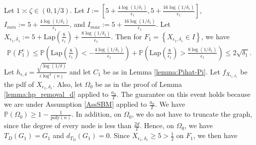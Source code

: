 \documentclass{article}
\begin{document}
Let $1 \asymp \zeta \in (0, 1/3)$. Let $I := \left[5 + \frac{4\log(1/\delta_1)}{\epsilon_1}, 5 + \frac{16\log(1/\delta_1)}{\epsilon_1}\right]$, $I_{min} := 5 + \frac{4\log(1/\delta_1)}{\epsilon_1}$, and $I_{max} := 5 + \frac{16\log(1/\delta_1)}{\epsilon_1}$. Let $X_{\epsilon_1, \delta_1} := 5 + \mathrm{Lap}\left(\frac{8}{\epsilon_1}\right) + \frac{8\log(1/\delta_1)}{\epsilon_1}$. Then for $F_1 = \left\{X_{\epsilon_1, \delta_1} \in I\right\}$, we have
\begin{align*}
 \mathbb{P}\left(F_1^c\right) \leq \mathbb{P}\left(\mathrm{Lap}\left(\frac{8}{\epsilon_1}\right) < -\frac{4\log(1/\delta_1)}{\epsilon_1}\right) + \mathbb{P}\left(\mathrm{Lap}\left(\frac{8}{\epsilon_1}\right) > \frac{8\log(1/\delta_1)}{\epsilon_1}\right) \leq 2\sqrt{\delta_1}.
\end{align*}
Let $h_{\epsilon, \delta} = \frac{\sqrt{\log(1/\delta)}}{\epsilon\log^4(n)}$ and let $C_1$ be as in Lemma \ref{lemma:Pihat-Pi}. Let $f_{X_{\epsilon_1, \delta_1}}$ be the pdf of $X_{\epsilon_1, \delta_1}$. Also, let $\Omega_0$ be as in the proof of Lemma \ref{lemma:hp_removal_d} applied to $\frac{a_n}{T}$. The guarantee on this event holds because we are under Assumption \ref{AssSBM} applied to $\frac{a_n}{T}$. We have $\mathbb{P}(\Omega_0) \geq 1 - \frac{1}{\mathrm{poly}(n)}$. In addition, on $\Omega_0$, we do not have to truncate the graph, since the degree of every node is less than $\frac{2d}{T}$. Hence, on $\Omega_0$, we have $T_{D}(G_1) = G_1$ and $d_{T_{D}}(G_1) = 0$. Since $X_{\epsilon_1, \delta_1} \geq 5 > \frac{1}{2}$ on $F_1$, we then have
\end{document}
